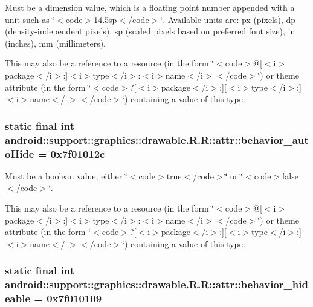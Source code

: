 Must be a dimension value, which is a floating point number appended with a unit such as \char`\"{}$<$code$>$14.5sp$<$/code$>$\char`\"{}. Available units are: px (pixels), dp (density-independent pixels), sp (scaled pixels based on preferred font size), in (inches), mm (millimeters). 

This may also be a reference to a resource (in the form \char`\"{}$<$code$>$@\mbox{[}$<$i$>$package$<$/i$>$:\mbox{]}$<$i$>$type$<$/i$>$:$<$i$>$name$<$/i$>$$<$/code$>$\char`\"{}) or theme attribute (in the form \char`\"{}$<$code$>$?\mbox{[}$<$i$>$package$<$/i$>$:\mbox{]}\mbox{[}$<$i$>$type$<$/i$>$:\mbox{]}$<$i$>$name$<$/i$>$$<$/code$>$\char`\"{}) containing a value of this type. \hypertarget{classandroid_1_1support_1_1graphics_1_1drawable_1_1_r_1_1attr_9729da2126b9076d2bb1fb0ed6c74ef9}{
\subsubsection[{behavior\_\-autoHide}]{\setlength{\rightskip}{0pt plus 5cm}static final int android::support::graphics::drawable.R.R::attr::behavior\_\-autoHide = 0x7f01012c}}
\label{classandroid_1_1support_1_1graphics_1_1drawable_1_1_r_1_1attr_9729da2126b9076d2bb1fb0ed6c74ef9}


Must be a boolean value, either \char`\"{}$<$code$>$true$<$/code$>$\char`\"{} or \char`\"{}$<$code$>$false$<$/code$>$\char`\"{}. 

This may also be a reference to a resource (in the form \char`\"{}$<$code$>$@\mbox{[}$<$i$>$package$<$/i$>$:\mbox{]}$<$i$>$type$<$/i$>$:$<$i$>$name$<$/i$>$$<$/code$>$\char`\"{}) or theme attribute (in the form \char`\"{}$<$code$>$?\mbox{[}$<$i$>$package$<$/i$>$:\mbox{]}\mbox{[}$<$i$>$type$<$/i$>$:\mbox{]}$<$i$>$name$<$/i$>$$<$/code$>$\char`\"{}) containing a value of this type. \hypertarget{classandroid_1_1support_1_1graphics_1_1drawable_1_1_r_1_1attr_dd19ff80fc4acc7334410634ebe890d7}{
\subsubsection[{behavior\_\-hideable}]{\setlength{\rightskip}{0pt plus 5cm}static final int android::support::graphics::drawable.R.R::attr::behavior\_\-hideable = 0x7f010109}}
\label{classandroid_1_1support_1_1graphics_1_1drawable_1_1_r_1_1attr_dd19ff80fc4acc7334410634ebe890d7}


